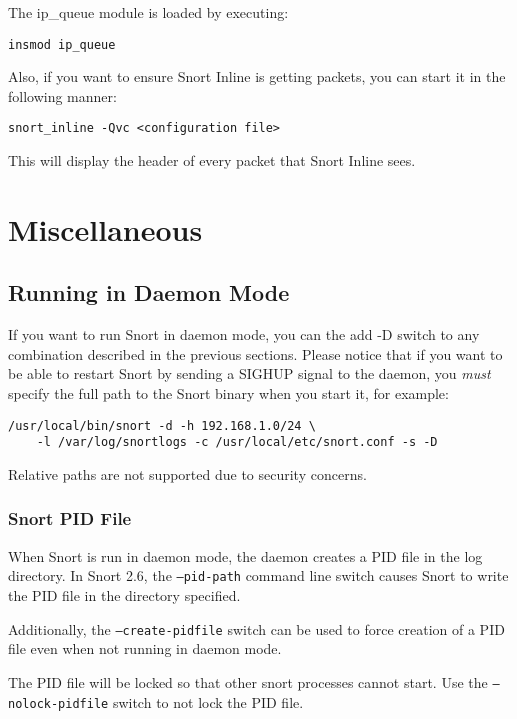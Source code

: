 \documentclass[english]{report}
\begin{document}
The ip\_queue module is loaded by executing:
\begin{verbatim}
insmod ip_queue
\end{verbatim}
Also, if you want to ensure Snort Inline is getting packets, you can 
start it in the following manner:
\begin{verbatim}
snort_inline -Qvc <configuration file>
\end{verbatim}
This will display the header of every packet that Snort Inline sees. 

\section{Miscellaneous}

\subsection{Running in Daemon Mode}

If you want to run Snort in daemon mode, you can the add -D switch to any
combination described in the previous sections. Please notice that if you want to be able to restart Snort
by sending a SIGHUP signal to the daemon, you {\em must} specify the full path to the Snort
binary when you start it, for example:

\begin{center}
\begin{verbatim}
/usr/local/bin/snort -d -h 192.168.1.0/24 \
    -l /var/log/snortlogs -c /usr/local/etc/snort.conf -s -D
\end{verbatim}
\end{center}

Relative paths are not supported due to security concerns.

\subsubsection{Snort PID File}

When Snort is run in daemon mode, the daemon creates a PID file in
the log directory.  In Snort 2.6, the \texttt{--pid-path} command line
switch causes Snort to write the PID file in the directory specified.

Additionally, the \texttt{--create-pidfile} switch can be used to
force creation of a PID file even when not running in daemon mode.

The PID file will be locked so that other snort processes cannot
start.  Use the \texttt{--nolock-pidfile} switch to not lock the
PID file.
\end{document}
